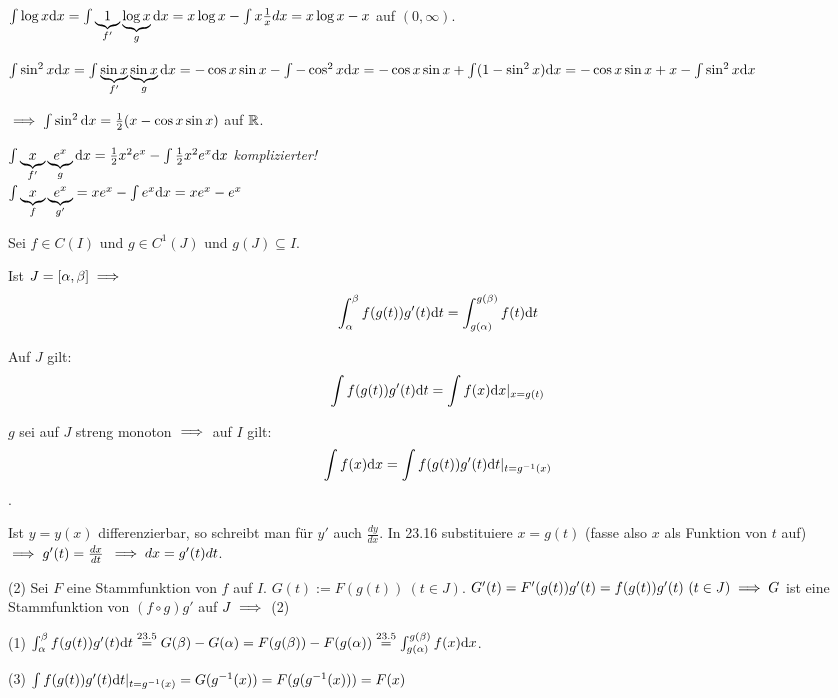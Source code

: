 \documentclass[a4paper,oneside,DIV15,BCOR12mm]{scrbook}
\begin{document}
\begin{beispiele}
\item $\int \log x\text{d}x=\int\underbrace{1}_{f'}\underbrace{\log x}_{g}\text{d}x=x\log x-\int x\frac{1}{x}dx=x\log x - x$ auf $(0, \infty)$.
\item $\int \sin^2 x\text{d}x = \int\underbrace{\sin x}_{f'}\underbrace{\sin x}_{g}\text{d}x = -\cos x\sin x - \int{-\cos^2 x\text{d}x}=-\cos x\sin x + \int(1-\sin^2 x)\text{d}x=-\cos x\sin x + x-\int\sin^2 x\text{d}x$

$\implies \int\sin^2\text{d}x =\frac{1}{2}(x-\cos x \sin x)$ auf $\mathbb{R}$.
\item $\int \underbrace{x}_{f'}\underbrace{e^x}_{g}\text{d}x=\frac{1}{2}x^2e^x-\int\frac{1}{2}x^2e^x\text{d}x$ \emph{komplizierter!}\\
$\int\underbrace{x}_{f}\underbrace{e^x}_{g'}=xe^x-\int{e^x\text{d}x}=xe^x-e^x$
\end{beispiele}

\begin{satz}[Substitutionsregeln]
Sei $f\in C(I)$ und $g \in C^1(J)$ und $g(J)\subseteq I$.
\begin{liste}
\item Ist $J=[\alpha, \beta]\implies$ $$\int_{\alpha}^{\beta}f(g(t))g'(t)\text{d}t=\int_{g(\alpha)}^{g(\beta)}f(t)\text{d}t$$
\item Auf $J$ gilt: $$\int f(g(t))g'(t)\text{d}t=\int f(x)\text{d}x|_{x=g(t)}$$
\item $g$ sei auf $J$ streng monoton $\implies$ auf $I$ gilt: $$\int f(x)\text{d}x=\int f(g(t))g'(t)\text{d}t|_{t=g^{-1}(x)}$$.
\end{liste}
\end{satz}

\begin{merkregel}
Ist $y=y(x)$ differenzierbar, so schreibt man für $y'$ auch $\frac{dy}{dx}$. In 23.16 substituiere $x=g(t)$ (fasse also $x$ als Funktion von $t$ auf) $\implies g'(t)=\frac{dx}{dt}$ \glqq$\implies dx=g'(t)dt$\grqq.
\end{merkregel}

\begin{beweise}
\item[(2)]
Sei $F$ eine Stammfunktion von $f$ auf $I$. $G(t):=F(g(t))\ (t\in J)$. $G'(t)=F'(g(t))g'(t)=f(g(t))g'(t)\ (t\in J)\implies G$ ist eine Stammfunktion von $(f\circ g)g'$ auf $J \implies$ (2)
\item[(1)]$\int_{\alpha}^{\beta}f(g(t))g'(t)\text{d}t\overset{23.5}{=}G(\beta)-G(\alpha)=F(g(\beta))-F(g(\alpha))\overset{23.5}{=}\int_{g(\alpha)}^{g(\beta)}f(x)\text{d}x$.
\item[(3)]$\int f(g(t))g'(t)\text{d}t|_{t=g^{-1}(x)}=G(g^{-1}(x))=F(g(g^{-1}(x)))=F(x)$
\end{beweise}
\end{document}
